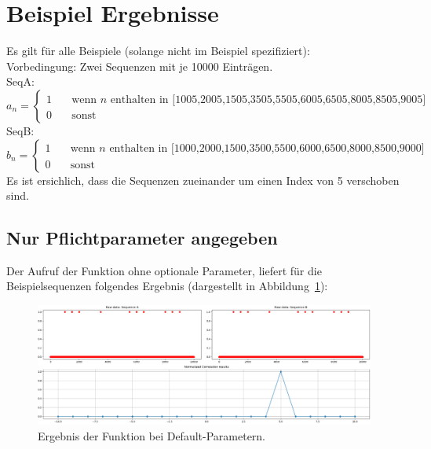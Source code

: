 \section{Beispiel Ergebnisse}
Es gilt für alle Beispiele (solange nicht im Beispiel spezifiziert):\\
Vorbedingung: Zwei Sequenzen mit je 10000 Einträgen. \\
SeqA:
\[ a_{n} =
  \begin{cases}
    1       & \quad \text{wenn } n \text{ enthalten in [1005,2005,1505,3505,5505,6005,6505,8005,8505,9005]}\\
    0  & \quad \text{sonst}
  \end{cases}
\]
SeqB:
\[ b_{n} =
  \begin{cases}
    1       & \quad \text{wenn } n \text{ enthalten in [1000,2000,1500,3500,5500,6000,6500,8000,8500,9000]}\\
    0  & \quad \text{sonst}
  \end{cases}
\]
Es ist ersichlich, dass die Sequenzen zueinander um einen Index von 5 verschoben sind.

\subsection{Nur Pflichtparameter angegeben}
Der Aufruf der Funktion ohne optionale Parameter, liefert für die Beispielsequenzen folgendes Ergebnis (dargestellt in Abbildung~\ref{fig:correlationDefaultParams}):
\begin{figure}[H]
    \includegraphics[width=\linewidth]{./images/correlationDefaultParams.PNG}
    \caption[Ergebnis: Default-Parameter]{Ergebnis der Funktion bei Default-Parametern\footnotemark.}
    \label{fig:correlationDefaultParams}
\end{figure}

